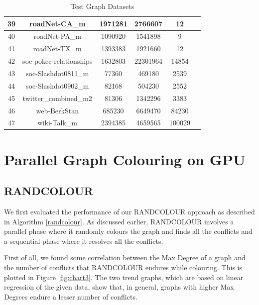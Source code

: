 \documentclass[MTech]{iitmdiss}
\begin{document}
\begin{table}[h]
\begin{tabular}{||c|c|c|c|c|c||}
\hline
39 & roadNet-CA\_m            & 1971281 & 2766607  & 12     & \cite{snapnets}    \\
\hline
40 & roadNet-PA\_m            & 1090920 & 1541898  & 9      & \cite{snapnets}    \\
\hline
41 & roadNet-TX\_m            & 1393383 & 1921660  & 12     & \cite{snapnets}    \\
\hline
42 & soc-pokec-relationships & 1632803 & 22301964 & 14854  & \cite{snapnets}    \\
\hline
43 & soc-Slashdot0811\_m      & 77360   & 469180   & 2539   & \cite{snapnets}    \\
\hline
44 & soc-Slashdot0902\_m      & 82168   & 504230   & 2552   & \cite{snapnets}    \\
\hline
45 & twitter\_combined\_m2     & 81306   & 1342296  & 3383   & \cite{snapnets}    \\
\hline
46 & web-BerkStan            & 685230  & 6649470  & 84230  & \cite{snapnets}    \\
\hline
47 & wiki-Talk\_m             & 2394385 & 4659565  & 100029 & \cite{snapnets}   
\\
\hline
\end{tabular}
\caption{Test Graph Datasets}
\label{table:4}
\end{table}

\section{Parallel Graph Colouring on GPU}
\subsection{RANDCOLOUR}
We first evaluated the performance of our RANDCOLOUR approach as described in Algorithm \ref{randcolour}. As discussed earlier, RANDCOLOUR involves a parallel phase where it randomly colours the graph and finds all the conflicts and a sequential phase where it resolves all the conflicts.

First of all, we found some correlation between the Max Degree of a graph and the number of conflicts that RANDCOLOUR endures while colouring. This is plotted in Figure \ref{fig:chart3}. The two trend graphs, which are based on linear regression of the given data, show that, in general, graphs with higher Max Degrees endure a lesser number of conflicts. 
\end{document}
